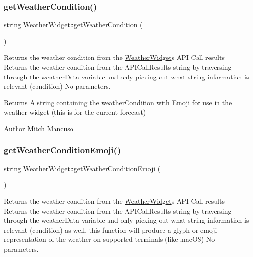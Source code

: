 \subsubsection{\texorpdfstring{get\+Weather\+Condition()}{getWeatherCondition()}}
{\footnotesize\ttfamily string Weather\+Widget\+::get\+Weather\+Condition (\begin{DoxyParamCaption}{ }\end{DoxyParamCaption})}



Returns the weather condition from the \mbox{\hyperlink{class_weather_widget}{Weather\+Widget}}\textquotesingle{}s A\+PI Call results  Returns the weather condition from the A\+P\+I\+Call\+Results string by traversing through the weather\+Data variable and only picking out what string information is relevant (condition)  No parameters. 

\begin{DoxyReturn}{Returns}
A string containing the weather\+Condition with Emoji for use in the weather widget (this is for the current forecast) 
\end{DoxyReturn}
\begin{DoxyAuthor}{Author}
Mitch Mancuso 
\end{DoxyAuthor}
\mbox{\label{class_weather_widget_aacd35e452cf154b858144de80862334f}} 
\subsubsection{\texorpdfstring{get\+Weather\+Condition\+Emoji()}{getWeatherConditionEmoji()}}
{\footnotesize\ttfamily string Weather\+Widget\+::get\+Weather\+Condition\+Emoji (\begin{DoxyParamCaption}{ }\end{DoxyParamCaption})}



Returns the weather condition from the \mbox{\hyperlink{class_weather_widget}{Weather\+Widget}}\textquotesingle{}s A\+PI Call results  Returns the weather condition from the A\+P\+I\+Call\+Results string by traversing through the weather\+Data variable and only picking out what string information is relevant (condition) as well, this function will produce a glyph or emoji representation of the weather on supported terminals (like mac\+OS)  No parameters. 

